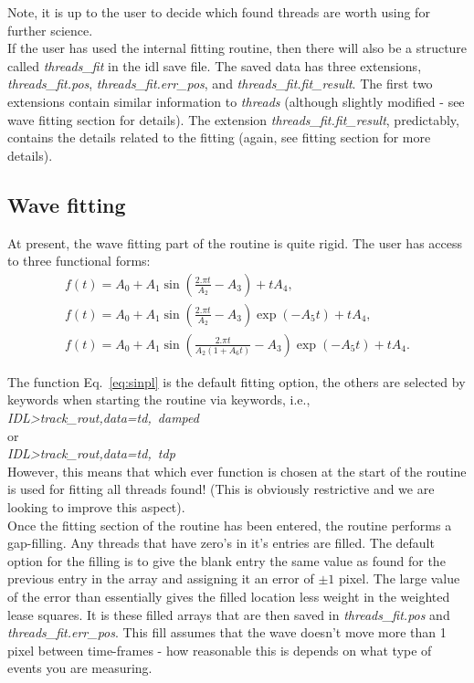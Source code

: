 \documentclass{article}
\begin{document}
Note, it is up to the user to decide which found threads are worth using for further science.\\

If the user has used the internal fitting routine, then there will also be a structure called 
\textit{threads\_fit} in the idl save file. The saved data has three extensions, \textit{threads\_fit.pos}, 
\textit{threads\_fit.err\_pos}, and  \textit{threads\_fit.fit\_result}. The first two extensions contain similar 
information to \textit{threads} (although slightly modified - see wave fitting section for details). The 
extension \textit{threads\_fit.fit\_result}, predictably, contains the details related to the fitting (again, see 
fitting section for more details).


\subsection{Wave fitting}

At present, the wave fitting part of the routine is quite rigid. The user has access to three functional 
forms:\\
 
\begin{eqnarray}
f(t)=A_0+A_1\sin\left( \frac{2.\pi t}{A_2}-A_3\right)+tA_4,\label{eq:sinpl}\\
f(t)=A_0+A_1\sin\left( \frac{2.\pi t}{A_2}-A_3\right)\exp(-A_5t)+tA_4,\\
f(t)=A_0+A_1\sin\left( \frac{2.\pi t}{A_2(1+A_6t)}-A_3\right)\exp(-A_5t)+tA_4.\label{eq:sintdp}
\end{eqnarray}

The function Eq.~\ref{eq:sinpl} is the default fitting option, the others are selected by keywords when starting the routine via keywords, i.e.,\\

\textit{IDL\textgreater track\_rout,data=td,\ damped} \\

or\\

\textit{IDL\textgreater track\_rout,data=td,\ tdp} \\

However, this means that which ever function is chosen at the start of the routine is used for fitting all threads found! (This is obviously restrictive and we are looking to
improve this aspect).\\

Once the fitting section of the routine has been entered, the routine performs a gap-filling. Any threads that have zero's in it's entries are filled. The default option for the 
filling is to give the blank entry the same value as found for the previous entry in the array and assigning it an error of $\pm1$ pixel. The large value of the error than 
essentially gives the filled location less weight in the weighted lease squares. It is these filled arrays that are then saved in \textit{threads\_fit.pos} and 
\textit{threads\_fit.err\_pos}. This fill assumes that the wave doesn't move more than 1 pixel between time-frames - how reasonable this is depends on what type of events 
you are measuring.\\
\end{document}
